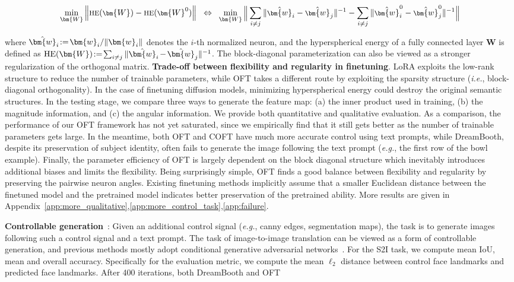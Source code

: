 \begin{equation}\label{eq:oft_principle}
\footnotesize
\min_{\bm{W}} \left\| \text{HE}(\bm{W})-\text{HE}(\bm{W}^0)\right\|~~\Leftrightarrow~~\min_{\bm{W}} \bigg{\|} \sum_{i\neq j} \|\hat{\bm{w}}_i-\hat{\bm{w}}_j\|^{-1}-\sum_{i\neq j} \|\hat{\bm{w}}^0_i-\hat{\bm{w}}^0_j\|^{-1}\bigg{\|}
\end{equation}

where $\thickmuskip=2mu \medmuskip=2mu \hat{\bm{w}}_i:=\bm{w}_i/\|\bm{w}_i\|$ denotes the $i$-th normalized neuron, and the hyperspherical energy of a fully connected layer $\bm{W}$ is defined as $\thickmuskip=2mu \medmuskip=2mu \text{HE}(\bm{W}):= \sum_{i\neq j} \|\hat{\bm{w}}_i-\hat{\bm{w}}_j\|^{-1}$. The block-diagonal parameterization can also be viewed as a stronger regularization of the orthogonal matrix. \textbf{Trade-off between flexibility and regularity in finetuning}. LoRA exploits the low-rank structure to reduce the number of trainable parameters, while OFT takes a different route by exploiting the sparsity structure (\emph{i.e.}, block-diagonal orthogonality). In the case of finetuning diffusion models, minimizing hyperspherical energy could destroy the original semantic structures. In the testing stage, we compare three ways to generate the feature map: (a) the inner product used in training, (b) the magnitude information, and (c) the angular information. We provide both quantitative and qualitative evaluation. As a comparison, the performance of our OFT framework has not yet saturated, since we empirically find that it still gets better as the number of trainable parameters gets large. In the meantime, both OFT and COFT have much more accurate control using text prompts, while DreamBooth, despite its preservation of subject identity, often fails to generate the image following the text prompt (\emph{e.g.}, the first row of the bowl example). Finally, the parameter efficiency of OFT is largely dependent on the block diagonal structure which inevitably introduces additional biases and limits the flexibility. Being surprisingly simple, OFT finds a good balance between flexibility and regularity by preserving the pairwise neuron angles. Existing finetuning methods implicitly assume that a smaller Euclidean distance between the finetuned model and the pretrained model indicates better preservation of the pretrained ability. More results are given in Appendix~\ref{app:more_qualitative},\ref{app:more_control_task},\ref{app:failure}. \item \textbf{Controllable generation}~\cite{zhang2023adding,mou2023t2i}: Given an additional control signal (\emph{e.g.}, canny edges, segmentation maps), the task is to generate images following such a control signal and a text prompt. The task of image-to-image translation can be viewed as a form of controllable generation, and previous methods mostly adopt conditional generative adversarial networks~\cite{isola2017image,zhu2017toward,wang2018high,park2019semantic,choi2018stargan}. For the S2I task, we compute mean IoU, mean and overall accuracy. Specifically for the evaluation metric, we compute the mean $\ell_2$ distance between control face landmarks and predicted face landmarks. After 400 iterations, both DreamBooth and OFT 